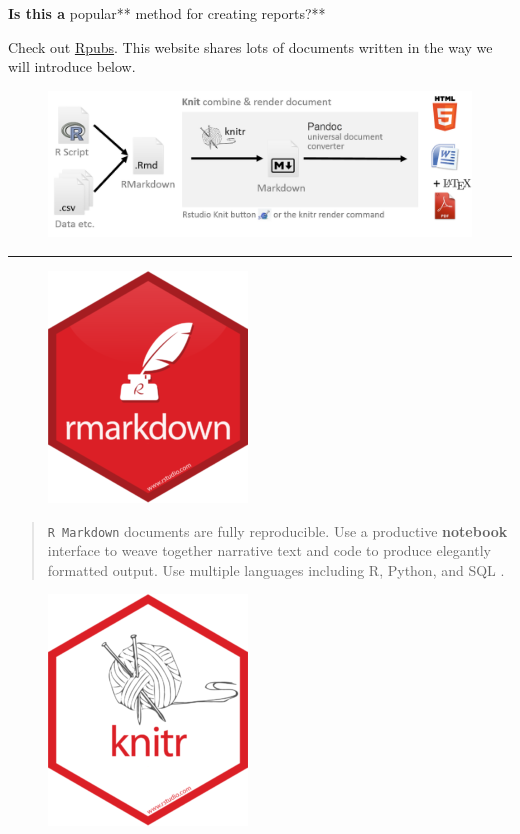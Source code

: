 \documentclass[]{book}
\theoremstyle{definition}
\theoremstyle{definition}
\theoremstyle{definition}
\theoremstyle{remark}
\begin{document}
\textbf{Is this a }popular** method for creating reports?**

Check out \href{http://rpubs.com/}{Rpubs}. This website shares lots of
documents written in the way we will introduce below.

\begin{figure}
\centering
\includegraphics{img/processRStudio.png}
\caption{}
\end{figure}

\begin{center}\rule{0.5\linewidth}{\linethickness}\end{center}

\begin{figure}
\centering
\includegraphics{img/hex/rmarkdown-200x232.png}
\caption{}
\end{figure}

\begin{quote}
\texttt{R\ Markdown} documents are fully reproducible. Use a productive
\textbf{notebook} interface to weave together narrative text and code to
produce elegantly formatted output. Use multiple languages including R,
Python, and SQL \citep{R-rmarkdown}.
\end{quote}

\begin{figure}
\centering
\includegraphics{img/hex/knitr-200x232.png}
\caption{}
\end{figure}
\end{document}
